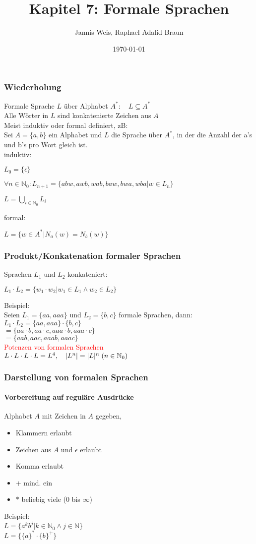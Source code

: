 \documentclass{beamer}
\title{Kapitel 7: Formale Sprachen}
\author{Jannis Weis, Raphael Adalid Braun}
\date{\today}
\institute{KIT - Karlruher Institut für Technologie}
\begin{document}
	\begin{frame}
		\titlepage
	\end{frame}
	\begin{frame}
		\frametitle{Wiederholung}
		Formale Sprache $L$ über Alphabet $A^{\ast}: \quad L\subseteq A^{\ast}$\\
		Alle Wörter in $L$ sind konkatenierte Zeichen aus $A$\\
		Meist induktiv oder formal definiert, zB:\\
		Sei $A=\{a,b\}$ ein Alphabet und $L$ die Sprache über $A^{\ast}$, in der die Anzahl der a's und b's pro Wort gleich ist.\\
		induktiv:
		\centerline{$L_{0}=\{\epsilon\}$}
		\centerline{$\forall n\in\mathbb{N}_{0}:L_{n+1}=\{abw,awb,wab,baw,bwa,wba\vert w\in L_{n}\}$}
		\centerline{$L=\bigcup\limits_{i\in\mathbb{N}_{0}}L_{i}$}
		formal:
		\centerline{$L=\{w\in A^{\ast}\vert N_{a}(w)=N_{b}(w)\}$}
	\end{frame}
	\begin{frame}
		\frametitle{Produkt/Konkatenation formaler Sprachen}
		Sprachen $L_{1}$ und $L_{2}$ konkateniert:\\
		\centerline{$L_{1}\cdot L_{2}=\{w_{1}\cdot w_{2}\vert w_{1}\in L_{1}\wedge w_{2}\in L_{2}\}$}
		Beispiel:\\
		Seien $L_{1}=\{aa, aaa\}$ und $L_{2}=\{b,c\}$ formale Sprachen, dann:\\
		$L_{1}\cdot L_{2}=\{aa,aaa\}\cdot\{b,c\}$\\
		\hspace{11.5mm}$=\{aa\cdot b,aa\cdot c,aaa\cdot b,aaa\cdot c\}$\\
		\hspace{11.5mm}$=\{aab,aac,aaab,aaac\}$\\
		\textcolor{red}{Potenzen von formalen Sprachen}\\
		$L\cdot L\cdot L\cdot L=L^{4},\quad\lvert L^{n}\rvert=\lvert L\rvert^{n}\thickspace(n\in\mathbb{N}_{0})$\\
	\end{frame}
	\begin{frame}
		\frametitle{Darstellung von formalen Sprachen}
		\framesubtitle{Vorbereitung auf reguläre Ausdrücke}
		Alphabet $A$ mit Zeichen in $A$ gegeben,\\
		\begin{itemize}
			\item Klammern erlaubt
			\item Zeichen aus $A$ und $\epsilon$ erlaubt
			\item Komma erlaubt
			\item $+$ mind. ein
			\item $\ast$ beliebig viele ($0$ bis $\infty$)
		\end{itemize}
		Beispiel:\\
		$L=\{a^{k}b^{j}\vert k\in\mathbb{N}_{0}\wedge j\in\mathbb{N}\}$\\
		$L=\{\{a\}^{\ast}\cdot\{b\}^{+}\}$\\
	\end{frame}
\end{document}
